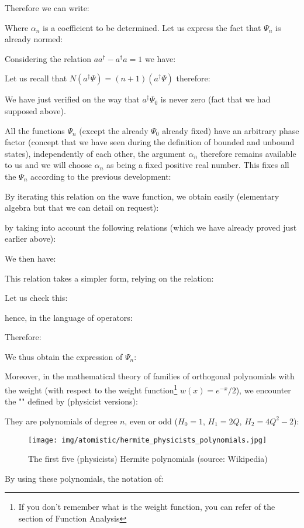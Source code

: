 	Therefore we can write:
	
	Where $\alpha_n$ is a coefficient to be determined. Let us express the fact that $\Psi_n$ is already normed:
	
	Considering the relation $aa^\dagger-a^\dagger a=1$ we have:
	
	Let us recall that $N(a^\dagger\Psi)=(n+1)(a^\dagger\Psi)$ therefore:
	
	We have just verified on the way that $a^\dagger\Psi_0$ is never zero (fact that we had supposed above).

	All the functions $\Psi_n$ (except the already $\Psi_0$ already fixed) have an arbitrary phase factor (concept that we have seen during the definition of bounded and unbound states), independently of each other, the argument $\alpha_n$ therefore remains available to us and we will choose $\alpha_n$ as being a fixed positive real number. This fixes all the $\Psi_n$ according to the previous development:
	
	By iterating this relation on the wave function, we obtain easily (elementary algebra but that we can detail on request):
	
	by taking into account the following relations (which we have already proved just earlier above):
	
	We then have:
	
	This relation takes a simpler form, relying on the relation:
	
	Let us check this:
	
	hence, in the language of operators:
	
	Therefore:
	
	We thus obtain the expression of $\Psi_n$:
	
	Moreover, in the mathematical theory of families of orthogonal polynomials with the weight (with respect to the weight function\footnote{If you don't remember what is the weight function, you can refer of the section of Function Analysis} $w(x)=e^{-x}/2$), we encounter the "" defined by (physicist versions):
	
	They are polynomials of degree $n$, even or odd ($H_0=1$, $H_1=2Q$, $H_2=4Q^2-2$):
	\begin{figure}[H]
		\centering
		\texttt{[image: img/atomistic/hermite\_physicists\_polynomials.jpg]}	
		\caption{The first five (physicists) Hermite polynomials (source: Wikipedia)}
	\end{figure}
	By using these polynomials, the notation of:
	
